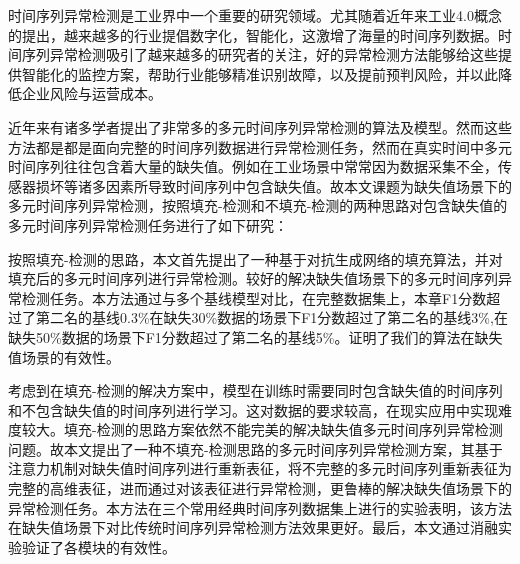 \begin{cabstract}

  时间序列异常检测是工业界中一个重要的研究领域。尤其随着近年来工业4.0概念的提出，越来越多的行业提倡数字化，智能化，这激增了海量的时间序列数据。时间序列异常检测吸引了越来越多的研究者的关注，好的异常检测方法能够给这些提供智能化的监控方案，帮助行业能够精准识别故障，以及提前预判风险，并以此降低企业风险与运营成本。
  
  近年来有诸多学者提出了非常多的多元时间序列异常检测的算法及模型。然而这些方法都是都是面向完整的时间序列数据进行异常检测任务，然而在真实时间中多元时间序列往往包含着大量的缺失值。例如在工业场景中常常因为数据采集不全，传感器损坏等诸多因素所导致时间序列中包含缺失值。故本文课题为缺失值场景下的多元时间序列异常检测，按照填充-检测和不填充-检测的两种思路对包含缺失值的多元时间序列异常检测任务进行了如下研究：

  按照填充-检测的思路，本文首先提出了一种基于对抗生成网络的填充算法，并对填充后的多元时间序列进行异常检测。较好的解决缺失值场景下的多元时间序列异常检测任务。本方法通过与多个基线模型对比，在完整数据集上，本章F1分数超过了第二名的基线0.3\%在缺失30\%数据的场景下F1分数超过了第二名的基线3\%,在缺失50\%数据的场景下F1分数超过了第二名的基线5\%。证明了我们的算法在缺失值场景的有效性。

  考虑到在填充-检测的解决方案中，模型在训练时需要同时包含缺失值的时间序列和不包含缺失值的时间序列进行学习。这对数据的要求较高，在现实应用中实现难度较大。填充-检测的思路方案依然不能完美的解决缺失值多元时间序列异常检测问题。故本文提出了一种不填充-检测思路的多元时间序列异常检测方案，其基于注意力机制对缺失值时间序列进行重新表征，将不完整的多元时间序列重新表征为完整的高维表征，进而通过对该表征进行异常检测，更鲁棒的解决缺失值场景下的异常检测任务。本方法在三个常用经典时间序列数据集上进行的实验表明，该方法在缺失值场景下对比传统时间序列异常检测方法效果更好。最后，本文通过消融实验验证了各模块的有效性。




\end{cabstract}

